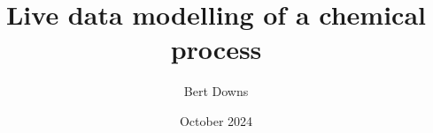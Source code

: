 \documentclass[12pt]{article}
\title{Live data modelling of a chemical process}
\author{Bert Downs }
\date{October 2024}
\begin{document}
\maketitle





\begin{appendices}


\end{appendices}
\end{document}
